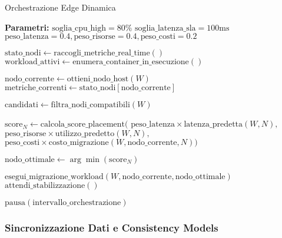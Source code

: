 \begin{algorithm}[H]
\caption{Orchestrazione Edge Dinamica}
\label{alg:orchestrazione-edge}
\begin{algorithmic}[1]
\State \textbf{Parametri:}
\State $\text{soglia\_cpu\_high} = 80\%$
\State $\text{soglia\_latenza\_sla} = 100\text{ms}$
\State $\text{peso\_latenza} = 0.4, \text{peso\_risorse} = 0.4, \text{peso\_costi} = 0.2$

    \State $\text{stato\_nodi} \leftarrow \text{raccogli\_metriche\_real\_time}()$
    \State $\text{workload\_attivi} \leftarrow \text{enumera\_container\_in\_esecuzione}()$
    
        \State $\text{nodo\_corrente} \leftarrow \text{ottieni\_nodo\_host}(W)$
        \State $\text{metriche\_correnti} \leftarrow \text{stato\_nodi}[\text{nodo\_corrente}]$
        
            \State $\text{candidati} \leftarrow \text{filtra\_nodi\_compatibili}(W)$
            
                \State $\text{score}_N \leftarrow \text{calcola\_score\_placement}($
                \State \hspace{2em} $\text{peso\_latenza} \times \text{latenza\_predetta}(W, N),$
                \State \hspace{2em} $\text{peso\_risorse} \times \text{utilizzo\_predetto}(W, N),$
                \State \hspace{2em} $\text{peso\_costi} \times \text{costo\_migrazione}(W, \text{nodo\_corrente}, N))$
            \EndFor
            
            \State $\text{nodo\_ottimale} \leftarrow \arg\min(\text{score}_N)$
            
                \State $\text{esegui\_migrazione\_workload}(W, \text{nodo\_corrente}, \text{nodo\_ottimale})$
                \State $\text{attendi\_stabilizzazione}()$
            \EndIf
        \EndIf
    \EndFor
    
    \State $\text{pausa}(\text{intervallo\_orchestrazione})$
\EndWhile
\end{algorithmic}
\end{algorithm}

\subsubsection{Sincronizzazione Dati e Consistency Models}

